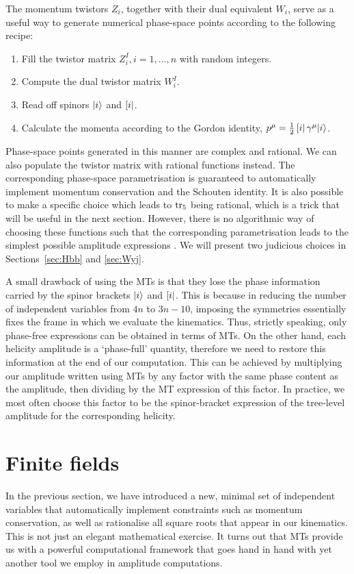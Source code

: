 \documentclass[main.tex]{subfiles}
\begin{document}
The momentum twistors $Z_i$, together with their dual equivalent $W_i$, serve as a useful way to generate numerical phase-space points according to the following recipe:
\begin{enumerate}
    \item Fill the twistor matrix $Z_i^I, i=1, \ldots, n$ with random integers.
    \item Compute the dual twistor matrix $W_i^I$.
    \item Read off spinors $|i \rangle$ and $\left[ i \right|$.
    \item Calculate the momenta according to the Gordon identity, $p^\mu = \frac{1}{2}\left[ i \right|\gamma^\mu |i\rangle$.
\end{enumerate}
Phase-space points generated in this manner are complex and rational. We can also populate the twistor matrix with rational functions instead. The corresponding phase-space parametrisation is guaranteed to automatically implement momentum conservation and the Schouten identity. It is also possible to make a specific choice which leads to $\operatorname{\rm tr}_5$ being rational, which is a trick that will be useful in the next section. However, there is no algorithmic way of choosing these functions such that the corresponding parametrisation leads to the simplest possible amplitude expressions . We will present two judicious choices in Sections~\ref{sec:Hbb} and \ref{sec:Wyj}.

A small drawback of using the MTs is that they lose the phase information carried by the spinor brackets $|i \rangle$ and $\left[ i \right|$. This is because in reducing the number of independent variables from $4n$ to $3n-10$, imposing the symmetries essentially fixes the frame in which we evaluate the kinematics. Thus, strictly speaking, only phase-free expressions can be obtained in terms of MTs. On the other hand, each helicity amplitude is a `phase-full' quantity, therefore we need to restore this information at the end of our computation. This can be achieved by multiplying our amplitude written using MTs by any factor with the same phase content as the amplitude, then dividing by the MT expression of this factor. In practice, we most often choose this factor to be the spinor-bracket expression of the tree-level amplitude for the corresponding helicity.
\section{Finite fields} \label{sec:FF}
In the previous section, we have introduced a new, minimal set of independent variables that automatically implement constraints such as momentum conservation, as well as rationalise all square roots that appear in our kinematics. This is not just an elegant mathematical exercise. It turns out that MTs provide us with a powerful computational framework that goes hand in hand with yet another tool we employ in amplitude computations.
\end{document}
